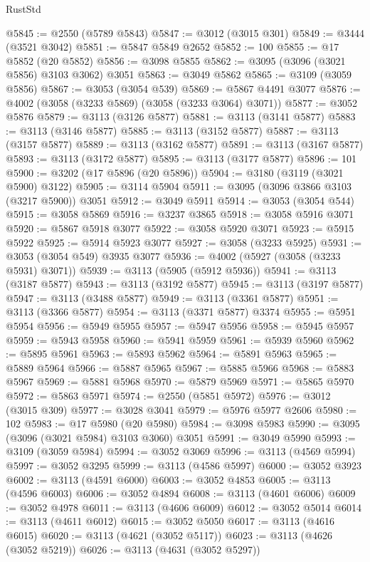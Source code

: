 \begin{lexlean}{RustStd}
\begin{coremodule}
{\begin{coremodule}
{{{{{{{{{{{{{{{{{{{{{{{{{{{{{{{{@5845 := @2550 (@5789 @5843)
@5847 := @3012 (@3015 @301)
@5849 := @3444 (@3521 @3042)
@5851 := @5847 @5849 @2652
@5852 := 100
@5855 := @17 @5852 (@20 @5852)
@5856 := @3098 @5855
@5862 := @3095 (@3096 (@3021 @5856) @3103 @3062) @3051
@5863 := @3049 @5862
@5865 := @3109 (@3059 @5856)
@5867 := @3053 (@3054 @539)
@5869 := @5867 @4491 @3077
@5876 := @4002 (@3058 (@3233 @5869) (@3058 (@3233 @3064) @3071))
@5877 := @3052 @5876
@5879 := @3113 (@3126 @5877)
@5881 := @3113 (@3141 @5877)
@5883 := @3113 (@3146 @5877)
@5885 := @3113 (@3152 @5877)
@5887 := @3113 (@3157 @5877)
@5889 := @3113 (@3162 @5877)
@5891 := @3113 (@3167 @5877)
@5893 := @3113 (@3172 @5877)
@5895 := @3113 (@3177 @5877)
@5896 := 101
@5900 := @3202 (@17 @5896 (@20 @5896))
@5904 := @3180 (@3119 (@3021 @5900) @3122)
@5905 := @3114 @5904
@5911 := @3095 (@3096 @3866 @3103 (@3217 @5900)) @3051
@5912 := @3049 @5911
@5914 := @3053 (@3054 @544)
@5915 := @3058 @5869
@5916 := @3237 @3865
@5918 := @3058 @5916 @3071
@5920 := @5867 @5918 @3077
@5922 := @3058 @5920 @3071
@5923 := @5915 @5922
@5925 := @5914 @5923 @3077
@5927 := @3058 (@3233 @5925)
@5931 := @3053 (@3054 @549) @3935 @3077
@5936 := @4002 (@5927 (@3058 (@3233 @5931) @3071))
@5939 := @3113 (@5905 (@5912 @5936))
@5941 := @3113 (@3187 @5877)
@5943 := @3113 (@3192 @5877)
@5945 := @3113 (@3197 @5877)
@5947 := @3113 (@3488 @5877)
@5949 := @3113 (@3361 @5877)
@5951 := @3113 (@3366 @5877)
@5954 := @3113 (@3371 @5877) @3374
@5955 := @5951 @5954
@5956 := @5949 @5955
@5957 := @5947 @5956
@5958 := @5945 @5957
@5959 := @5943 @5958
@5960 := @5941 @5959
@5961 := @5939 @5960
@5962 := @5895 @5961
@5963 := @5893 @5962
@5964 := @5891 @5963
@5965 := @5889 @5964
@5966 := @5887 @5965
@5967 := @5885 @5966
@5968 := @5883 @5967
@5969 := @5881 @5968
@5970 := @5879 @5969
@5971 := @5865 @5970
@5972 := @5863 @5971
@5974 := @2550 (@5851 @5972)
@5976 := @3012 (@3015 @309)
@5977 := @3028 @3041
@5979 := @5976 @5977 @2606
@5980 := 102
@5983 := @17 @5980 (@20 @5980)
@5984 := @3098 @5983
@5990 := @3095 (@3096 (@3021 @5984) @3103 @3060) @3051
@5991 := @3049 @5990
@5993 := @3109 (@3059 @5984)
@5994 := @3052 @3069
@5996 := @3113 (@4569 @5994)
@5997 := @3052 @3295
@5999 := @3113 (@4586 @5997)
@6000 := @3052 @3923
@6002 := @3113 (@4591 @6000)
@6003 := @3052 @4853
@6005 := @3113 (@4596 @6003)
@6006 := @3052 @4894
@6008 := @3113 (@4601 @6006)
@6009 := @3052 @4978
@6011 := @3113 (@4606 @6009)
@6012 := @3052 @5014
@6014 := @3113 (@4611 @6012)
@6015 := @3052 @5050
@6017 := @3113 (@4616 @6015)
@6020 := @3113 (@4621 (@3052 @5117))
@6023 := @3113 (@4626 (@3052 @5219))
@6026 := @3113 (@4631 (@3052 @5297))
}}}}}}}}}}}}}}}}}}}}}}}}}}}}}}}}
\end{coremodule}}
\end{coremodule}
\end{lexlean}
